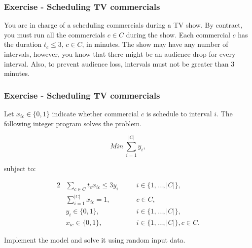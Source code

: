 \documentclass{beamer}
\begin{document}
\begin{frame}
  \frametitle{Exercise - Scheduling TV commercials}
  You are in charge of a scheduling commercials during a TV show. By contract, you must run all the commercials $c \in C$ during the show. Each commercial $c$ has the duration $t_c \leq 3$, $c \in C$, in minutes. The show may have any number of intervals, however, you know that there might be an audience drop for every interval. Also, to prevent audience loss, intervals must not be greater than 3 minutes. 
\end{frame}


\begin{frame}
  \frametitle{Exercise - Scheduling TV commercials}

  \footnotesize

  Let $x_{ic} \in \{0, 1\}$ indicate whether commercial $c$ is schedule to interval $i$. The following integer program solves the problem.
  
  \begin{equation*}
  Min\ \sum_{i=1}^{|C|} y_i,
  \end{equation*}

  subject to:

  \vspace{-0.7cm}
  \begin{alignat*}{2}
    &\sum_{c \in C} t_c x_{ic} \leq 3 y_i && \quad i \in \{1, \ldots, |C|\},\\
    & \sum_{i=1}^{|C|} x_{ic} = 1, && \quad c \in C,\\
    & y_i \in \{0, 1\}, && \quad i \in \{1, \ldots, |C|\},\\
    & x_{ic} \in \{0, 1\}, && \quad i \in \{1, \ldots, |C|\}, c \in C. 
  \end{alignat*}

Implement the model and solve it using random input data.
  
\end{frame}
\end{document}
